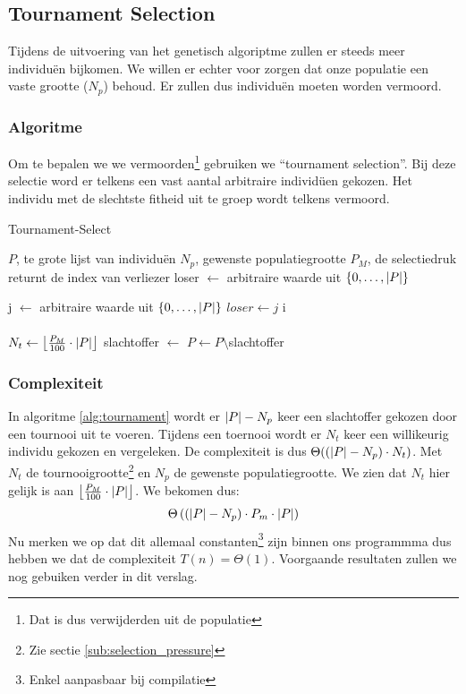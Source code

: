 %
\subsection{Tournament Selection}
\label{sub:tournament}
Tijdens de uitvoering van het genetisch algoriptme zullen er steeds meer individuën bijkomen. We willen er echter voor zorgen dat onze populatie een vaste grootte ($N_p$) behoud. Er zullen dus individuën moeten worden vermoord.
\subsubsection{Algoritme}
Om te bepalen we we vermoorden\footnote{Dat is dus verwijderden uit de populatie} gebruiken we ``tournament selection''. Bij deze selectie word er telkens een vast aantal arbitraire individüen gekozen. Het individu met de slechtste fitheid uit te groep wordt telkens vermoord.
	\begin{algorithm}[H]
	 	\caption{Tournament-Select}
		\begin{algorithmic}
		\Require 
			\State $P$, te grote lijst van individuën 
			\State $N_p$, gewenste populatiegrootte
			\State $P_M$, de selectiedruk
		\Ensure returnt de index van verliezer
		\State loser $\gets$ arbitraire waarde uit $\lbrace 0, \dots, \lvert P \rvert \rbrace$

		\State j $\gets$ arbitraire waarde uit $\lbrace 0, \dots, \lvert P \rvert \rbrace$
			\State $loser \gets j$
		\EndIf
		\EndFor		
		\State \Return i
		\EndFunction
		\\
		\\
			\State $N_t \gets \left\lfloor\frac{P_M}{100} \cdot \lvert P \rvert\right\rfloor$ 
			\State slachtoffer $\gets$ 
			\State $P \gets P\setminus$slachtoffer
		\EndWhile
		
		\end{algorithmic}
		\label{alg:tournament}
	\end{algorithm}		
\subsubsection{Complexiteit}
In algoritme \ref{alg:tournament} wordt er $\lvert P \rvert-N_p$ keer een slachtoffer gekozen door een tournooi uit te voeren. Tijdens een toernooi wordt er $N_t$ keer een willikeurig individu gekozen en vergeleken. De complexiteit is dus $\Theta((\lvert P \rvert-N_p)\cdot N_t)$. Met $N_t$ de tournooigrootte\footnote{Zie sectie \ref{sub:selection_pressure}} en $N_p$ de gewenste populatiegrootte. We zien dat $N_t$ hier gelijk is aan
 $\left\lfloor\frac{P_M}{100} \cdot \lvert P \rvert\right\rfloor$.
 We bekomen dus: \[\Theta\left(\left(\lvert P \rvert-N_p\right)\cdot P_m \cdot \lvert P \rvert\right)\]
 Nu merken we op dat dit allemaal constanten\footnote{Enkel aanpasbaar bij compilatie} zijn binnen ons programmma dus hebben we dat de complexiteit $T(n) = \Theta(1)$. Voorgaande resultaten zullen we nog gebuiken verder in dit verslag. %

